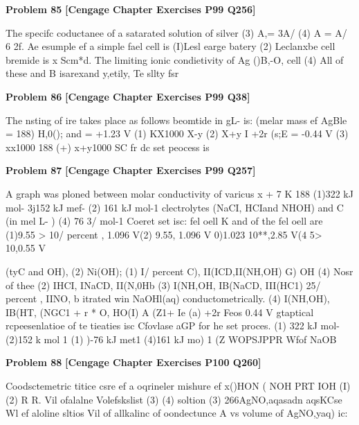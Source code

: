 \begin{problembox}
\textbf{Problem 85} \hfill \textbf{[Cengage Chapter Exercises P99 Q256]}
\label{q:ext-cng-th-85}

The specifc coductanee of a satarated solution of silver
(3) A,= 3A/ 
(4) A = A/ 6
2f. Ae esumple ef a simple fael cell is
(I)Lesl earge batery
(2) Leclanxbe cell
bremide is x Scm*d. The limiting ionic condietivity of Ag
()B,-O, cell
(4) All of these
and B isarexand y,etily, Te sllty fsr
\end{problembox}

\begin{problembox}
\textbf{Problem 86} \hfill \textbf{[Cengage Chapter Exercises P99 Q38]}
\label{q:ext-cng-th-86}

The nsting of ire takes place as follows
beomtide in gL- is: (melar mass ef AgBle = 188)
 H,0();  and   = +1.23 V
(1)
KX1000
X-y
(2)
X+y
I +2r (s;E = -0.44 V
(3)
xx1000 188
(+)
x+y1000
SC  fr dc set peocess is
\end{problembox}

\begin{problembox}
\textbf{Problem 87} \hfill \textbf{[Cengage Chapter Exercises P99 Q257]}
\label{q:ext-cng-th-87}

A graph was ploned between molar conductivity of varicus
x + 7
K
188
(1)322 kJ mol-
3j152 kJ mef-
(2) 161 kJ mol-1
clectrolytes (NaCI, HCIand NHOH) and C (in mel L- )
(4) 76 3/ mol-1
Coeret set isc:
fel oell K and  of the fel oell are
(1)9.55 > 10/ percent , 1.096 V(2) 9.55, 1.096 V
0)1.023 10**,2.85 V(4 5> 10,0.55 V

(tyC and OH),
(2) Ni(OH);
(1) I/ percent C), II(ICD,II(NH,OH)
G) OH
(4) Nosr of thee
(2) IHCI, INaCD, II(N,0Hb
(3) I(NH,OH, IB(NaCD, III(HC1)
25/ percent , IINO,  b itrated win NaOHl(aq) conductometrically.
(4) I(NH,OH), IB(HT, (NGC1
  + r *
O,
  HO(I)
A (Z1+
Ie (a) +2r   Feos
0.44 V
gtaptical rcpeesenlatioe of te tieaties isc
Cfovlase aGP for he set proces.
(1) 322 kJ mol-
(2)152 k mol 1
(1)
)-76 kJ met1
(4)161 kJ mo) 1
(Z
WOPSJPPR
Wfof NaOB
\end{problembox}

\begin{problembox}
\textbf{Problem 88} \hfill \textbf{[Cengage Chapter Exercises P100 Q260]}
\label{q:ext-cng-th-88}

Coodsctemetric titice csre ef a oqrineler mishure ef 
x()HON ( NOH PRT IOH
(I)
(2)
R
R.
Vil ofalalne
Volefskslist
(3)
(4)
soltion
(3)
266AgNO,aqasadn aqsKCse
Wl ef aloline
sltios
Vil of allkalinc
of oondectunce A vs volume of AgNO,yaq) ic:
\end{problembox}

